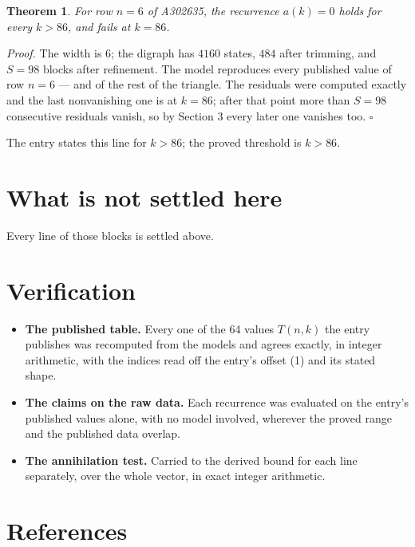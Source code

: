 \documentclass[11pt]{article}
\newtheorem{theorem}{Theorem}
\theoremstyle{definition}
\begin{document}
\begin{theorem} For row $n = 6$ of A302635, the recurrence $a(k) = 0$ holds for every $k > 86$, and fails at $k = 86$.\end{theorem}

{\itshape Proof.} The width is $6$; the digraph has $4160$ states, $484$ after trimming, and $S = 98$ blocks after refinement. The model reproduces every published value of row $n = 6$ --- and of the rest of the triangle. The residuals were computed exactly and the last nonvanishing one is at $k = 86$; after that point more than $S = 98$ consecutive residuals vanish, so by Section 3 every later one vanishes too. $\square$

The entry states this line for $k > 86$; the proved threshold is $k > 86$.

\section{What is not settled here}

Every line of those blocks is settled above.

\section{Verification}

\begin{itemize}

\item {\bfseries The published table.} Every one of the 64 values $T(n,k)$ the entry publishes was recomputed from the models and agrees exactly, in integer arithmetic, with the indices read off the entry's offset (1) and its stated shape.

\item {\bfseries The claims on the raw data.} Each recurrence was evaluated on the entry's published values alone, with no model involved, wherever the proved range and the published data overlap.

\item {\bfseries The annihilation test.} Carried to the derived bound for each line separately, over the whole vector, in exact integer arithmetic.

\end{itemize}

\section{References}
\end{document}
